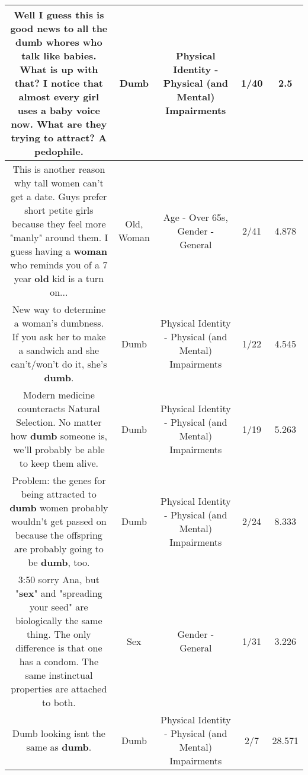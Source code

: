 \documentclass[11pt]{article}
\newlength\mylength
\begin{document}
\begin{center}
\begin{longtable}{|C{.65\mylength}|C{.30\mylength}|C{.12\mylength}|C{.12\mylength}|C{.12\mylength}|}
  \small Well I guess this is good news to all the \textbf{dumb} whores who talk like babies. What is up with that? I notice that almost every girl uses a baby voice now. What are they trying to attract? A pedophile.\normalsize   & Dumb & Physical Identity - Physical (and Mental) Impairments & 1/40 & 2.5 \\  \hline
  \small This is another reason why tall women can't get a date. Guys prefer short petite girls because they feel more "manly" around them. I guess having a \textbf{woman} who reminds you of a 7 year \textbf{old} kid is a turn on...\normalsize   & Old, Woman & Age - Over 65s, Gender - General & 2/41 & 4.878 \\  \hline
  \small New way to determine a woman's dumbness. If you ask her to make a sandwich and she can't/won't do it, she's \textbf{dumb}.\normalsize   & Dumb & Physical Identity - Physical (and Mental) Impairments & 1/22 & 4.545 \\  \hline
  \small Modern medicine counteracts Natural Selection. No matter how \textbf{dumb} someone is, we'll probably be able to keep them alive.\normalsize   & Dumb & Physical Identity - Physical (and Mental) Impairments & 1/19 & 5.263 \\  \hline
  \small Problem: the genes for being attracted to \textbf{dumb} women probably wouldn't get passed on because the offspring are probably going to be \textbf{dumb}, too.\normalsize   & Dumb & Physical Identity - Physical (and Mental) Impairments & 2/24 & 8.333 \\  \hline
  \small 3:50 sorry Ana, but "\textbf{sex}" and "spreading your seed" are biologically the same thing. The only difference is that one has a condom. The same instinctual properties are attached to both.\normalsize   & Sex & Gender - General & 1/31 & 3.226 \\  \hline
  \small Dumb looking isnt the same as \textbf{dumb}.\normalsize   & Dumb & Physical Identity - Physical (and Mental) Impairments & 2/7 & 28.571 \\  \hline

\end{longtable}
\end{center}
\end{document}
